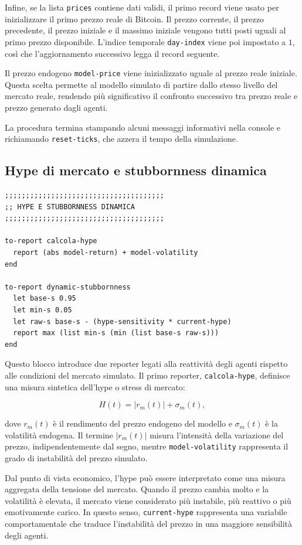 Infine, se la lista \texttt{prices} contiene dati validi, il primo record viene
usato per inizializzare il primo prezzo reale di Bitcoin. Il prezzo corrente,
il prezzo precedente, il prezzo iniziale e il massimo iniziale vengono tutti
posti uguali al primo prezzo disponibile. L'indice temporale \texttt{day-index}
viene poi impostato a \(1\), così che l'aggiornamento successivo legga il record
seguente.

Il prezzo endogeno \texttt{model-price} viene inizializzato uguale al prezzo
reale iniziale. Questa scelta permette al modello simulato di partire dallo stesso
livello del mercato reale, rendendo più significativo il confronto successivo tra
prezzo reale e prezzo generato dagli agenti.

La procedura termina stampando alcuni messaggi informativi nella console e
richiamando \texttt{reset-ticks}, che azzera il tempo della simulazione.

\subsection{Hype di mercato e stubbornness dinamica}

\begin{lstlisting}[caption={Calcolo dell'hype e della stubbornness dinamica}]
;;;;;;;;;;;;;;;;;;;;;;;;;;;;;;;;;;;;;;
;; HYPE E STUBBORNNESS DINAMICA
;;;;;;;;;;;;;;;;;;;;;;;;;;;;;;;;;;;;;;

to-report calcola-hype
  report (abs model-return) + model-volatility
end

to-report dynamic-stubbornness
  let base-s 0.95
  let min-s 0.05
  let raw-s base-s - (hype-sensitivity * current-hype)
  report max (list min-s (min (list base-s raw-s)))
end
\end{lstlisting}

Questo blocco introduce due reporter legati alla reattività degli agenti rispetto
alle condizioni del mercato simulato. Il primo reporter, \texttt{calcola-hype},
definisce una misura sintetica dell'hype o stress di mercato:

\[
H(t)=|r_m(t)|+\sigma_m(t),
\]

dove \(r_m(t)\) è il rendimento del prezzo endogeno del modello e
\(\sigma_m(t)\) è la volatilità endogena. Il termine \(|r_m(t)|\) misura
l'intensità della variazione del prezzo, indipendentemente dal segno, mentre
\texttt{model-volatility} rappresenta il grado di instabilità del prezzo
simulato.

Dal punto di vista economico, l'hype può essere interpretato come una misura
aggregata della tensione del mercato. Quando il prezzo cambia molto e la
volatilità è elevata, il mercato viene considerato più instabile, più reattivo o
più emotivamente carico. In questo senso, \texttt{current-hype} rappresenta una
variabile comportamentale che traduce l'instabilità del prezzo in una maggiore
sensibilità degli agenti.


